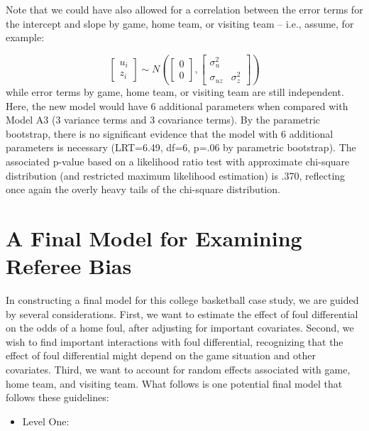 \documentclass[
]{krantz}
\providecommand{\tightlist}{%
  \setlength{\itemsep}{0pt}\setlength{\parskip}{0pt}}
\begin{document}
\vspace{1cm}

Note that we could have also allowed for a correlation between the error terms for the intercept and slope by game, home team, or visiting team -- i.e., assume, for example:

\[ \left[ \begin{array}{c}
            u_{i} \\ z_{i}
          \end{array}  \right] \sim N \left( \left[
          \begin{array}{c}
            0 \\ 0
          \end{array} \right], \left[
          \begin{array}{cc}
            \sigma_{u}^{2} & \\
            \sigma_{uz} & \sigma_{z}^{2}
          \end{array} \right] \right) \]
while error terms by game, home team, or visiting team are still independent. Here, the new model would have 6 additional parameters when compared with Model A3 (3 variance terms and 3 covariance terms). By the parametric bootstrap, there is no significant evidence that the model with 6 additional parameters is necessary (LRT=6.49, df=6, p=.06 by parametric bootstrap). The associated p-value based on a likelihood ratio test with approximate chi-square distribution (and restricted maximum likelihood estimation) is .370, reflecting once again the overly heavy tails of the chi-square distribution.

\hypertarget{sec:finalmodel-glmm}{%
\section{A Final Model for Examining Referee Bias}\label{sec:finalmodel-glmm}}

In constructing a final model for this college basketball case study, we are guided by several considerations. First, we want to estimate the effect of foul differential on the odds of a home foul, after adjusting for important covariates. Second, we wish to find important interactions with foul differential, recognizing that the effect of foul differential might depend on the game situation and other covariates. Third, we want to account for random effects associated with game, home team, and visiting team. What follows is one potential final model that follows these guidelines:

\begin{itemize}
\tightlist
\item
  Level One:
\end{itemize}
\end{document}
